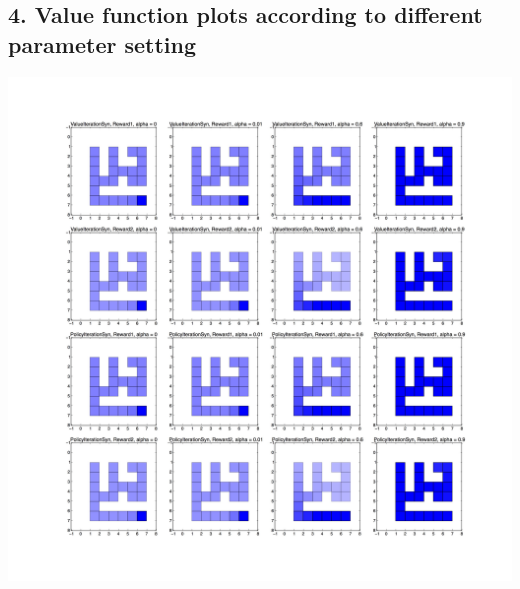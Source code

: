 \documentclass[12pt,a4paper,titlepage]{article}
\begin{document}
\subsection*{4. Value function plots according to different parameter setting}
\begin{center}
\includegraphics[scale=0.11]{ValueFunctionPlot.jpg}
\end{center}
\end{document}
